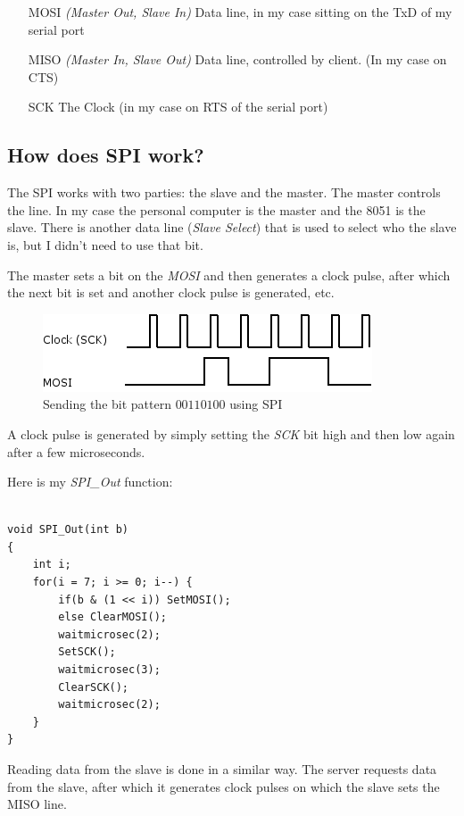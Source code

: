 \documentclass[a4paper]{article}
\begin{document}
\begin{itemize}
\item[MOSI] {\em (Master Out, Slave In)} Data line, in my case sitting on the TxD of my serial port
\item[MISO] {\em (Master In, Slave Out)} Data line, controlled by client. (In my case on CTS)
\item[SCK] The Clock (in my case on RTS of the serial port)
\end{itemize}

\subsection{How does SPI work?}

The SPI works with two parties: the slave and the master. The master controls 
the line. In my case the personal computer is the master and the 8051 is 
the slave. There is another data line ({\em Slave Select}) that is used to select 
who the slave is, but I didn't need to use that bit.

The master sets a bit on the {\em MOSI} and then generates a clock pulse, after 
which the next bit is set and another clock pulse is generated, etc.

\begin{figure}
\caption{Sending the bit pattern $0011 0100$ using SPI}

\includegraphics{SPI1}
\end{figure}

A clock pulse is generated by simply setting the {\em SCK} bit high and then low 
again after a few microseconds.

Here is my {\em SPI\_Out} function:

\begin{lstlisting}

void SPI_Out(int b)
{
	int i;
	for(i = 7; i >= 0; i--) {
		if(b & (1 << i)) SetMOSI();
		else ClearMOSI();
		waitmicrosec(2);
		SetSCK();
		waitmicrosec(3);
		ClearSCK();
		waitmicrosec(2);
	}
}

\end{lstlisting}

Reading data from the slave is done in a similar way. The server requests 
data from the slave, after which it generates clock pulses on which the slave
sets the MISO line.
\end{document}
